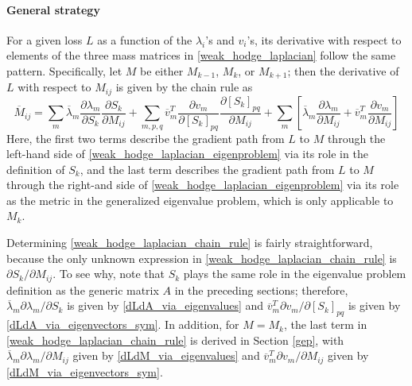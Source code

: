 \documentclass[11pt, a4paper]{article}
\begin{document}
\paragraph{General strategy}
For a given loss $L$ as a function of the $\lambda_i$'s and $v_i$'s, its derivative with respect to elements of the three mass matrices in \eqref{weak_hodge_laplacian} follow the same pattern. Specifically, let $M$ be either $M_{k-1}$, $M_k$, or $M_{k+1}$; then the derivative of $L$ with respect to $M_{ij}$ is given by the chain rule as
\begin{equation}
    \overline M_{ij} = \sum_m \overline\lambda_m\frac{\partial \lambda_m}{\partial S_k}\frac{\partial S_k}{\partial M_{ij}} + \sum_{m,p,q} \overline v_m^T\frac{\partial v_m}{\partial [S_k]_{pq}} \frac{\partial [S_k]_{pq}}{\partial M_{ij}} + \sum_m\left[ \overline\lambda_m\frac{\partial \lambda_m}{\partial M_{ij}} + \overline v_m^T\frac{\partial v_m}{\partial M_{ij}} \right]
    \label{weak_hodge_laplacian_chain_rule}
\end{equation}
Here, the first two terms describe the gradient path from $L$ to $M$ through the left-hand side of \eqref{weak_hodge_laplacian_eigenproblem} via its role in the definition of $S_k$, and the last term describes the gradient path from $L$ to $M$ through the right-and side of \eqref{weak_hodge_laplacian_eigenproblem} via its role as the metric in the generalized eigenvalue problem, which is only applicable to $M_k$.

Determining \eqref{weak_hodge_laplacian_chain_rule} is fairly straightforward, because the only unknown expression in \eqref{weak_hodge_laplacian_chain_rule} is $\partial S_k/\partial M_{ij}$. To see why, note that $S_k$ plays the same role in the eigenvalue problem definition as the generic matrix $A$ in the preceding sections; therefore, $\overline\lambda_m\partial \lambda_m/\partial S_k$ is given by \eqref{dLdA_via_eigenvalues} and $\overline v_m^T \partial v_m/\partial [S_k]_{pq}$ is given by \eqref{dLdA_via_eigenvectors_sym}. In addition, for $M = M_k$, the last term in \eqref{weak_hodge_laplacian_chain_rule} is derived in Section \ref{gep}, with $\overline\lambda_m \partial \lambda_m/\partial M_{ij}$ given by \eqref{dLdM_via_eigenvalues} and $\overline v_m^T \partial v_m/\partial M_{ij}$ given by \eqref{dLdM_via_eigenvectors_sym}.
\end{document}
